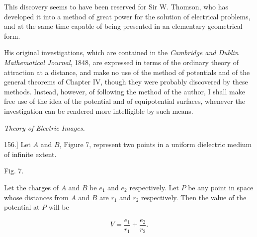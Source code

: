\documentclass[11pt,a4paper]{article}
\begin{document}
This discovery seems to have been reserved for Sir W. Thomson, who has developed it into a method of great power for the solution of electrical problems, and at the same time capable of being presented in an elementary geometrical form.

His original investigations, which are contained in the \emph{Cambridge and Dublin Mathematical Journal}, 1848, are expressed in terms of the ordinary theory of attraction at a distance, and make no use of the method of potentials and of the general theorems of Chapter IV, though they were probably discovered by these methods. Instead, however, of following the method of the author, I shall make free use of the idea of the potential and of equipotential surfaces, whenever the investigation can be rendered more intelligible by such means.

{\centering\itshape Theory of Electric Images.\par}

156.] Let $A$ and $B$, Figure 7, represent two points in a uniform dielectric medium of infinite extent.

\begin{center}

Fig. 7.
\end{center}

Let the charges of $A$ and $B$ be $e_1$ and $e_2$ respectively. Let $P$ be any point in space whose distances from $A$ and $B$ are $r_1$ and $r_2$ respectively. Then the value of the potential at $P$ will be

\begin{equation}\tag{1}
V=\frac{e_1}{r_1}+\frac{e_2}{r_2}.
\end{equation}
\end{document}
